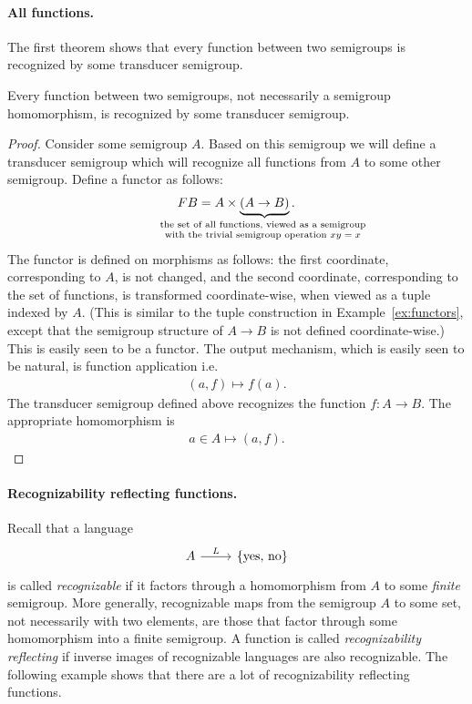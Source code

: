 \paragraph*{All functions.} The first theorem shows that every function between two semigroups is recognized by some transducer semigroup.

\begin{theorem}\label{thm:all-functions} 
     Every function    between two semigroups, not necessarily a semigroup homomorphism, is recognized  by some transducer semigroup.
\end{theorem}
\begin{proof}
    Consider some semigroup $A$. Based on this semigroup we will define a transducer semigroup which will recognize all functions from $A$ to some other semigroup. Define  a functor as follows:
\begin{align*}
\functor B = A \times \myunderbrace{(A \to B)}{the set of all  functions, viewed as a semigroup \\ 
with the trivial semigroup operation $xy = x$}.
\end{align*}
The functor is defined on morphisms
as follows: the first coordinate, corresponding to $A$, is not changed, and the second coordinate, corresponding to the set of functions, is transformed   coordinate-wise, when viewed as a tuple indexed by $A$. (This is similar to the tuple construction in Example~\ref{ex:functors}, except that the semigroup structure of $A \to B$ is not defined coordinate-wise.)  This is easily seen to be a functor. 
The output mechanism, which is easily seen to be natural, is function application i.e.
\begin{align*}
    (a,f) \mapsto f(a).
\end{align*}
The transducer semigroup defined above recognizes the function $f : A \to B$. The appropriate homomorphism  is 
\begin{align*}
a \in A  \mapsto  (a,f).
\end{align*} 
\end{proof}

\paragraph*{Recognizability reflecting functions.} Recall that a language 
\[
\begin{tikzcd}
A 
\ar[r,"L"]
&
\set{\text{yes, no}}
\end{tikzcd}
\]
is called \emph{recognizable} if it factors through a homomorphism from $A$ to some \emph{finite} semigroup.  More generally, recognizable maps from the semigroup $A$ to some set, not necessarily with two elements, are those that factor through some homomorphism into a finite semigroup. A function is called \emph{recognizability reflecting} if  
inverse images of recognizable languages are also recognizable. The following example shows that there are a lot of recognizability reflecting functions.


